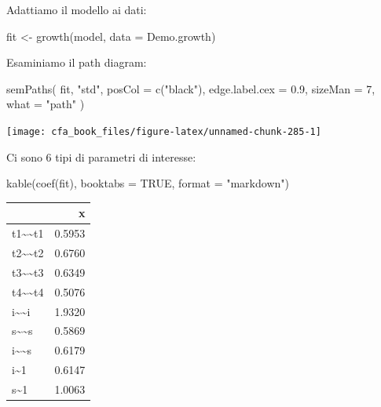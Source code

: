 \documentclass[
  11pt,
]{krantz}
\makeatletter
\newenvironment{Shaded}{\begin{snugshade}}{\end{snugshade}}
\newcommand{\AttributeTok}[1]{\textcolor[rgb]{0.61,0.61,0.61}{#1}}
\newcommand{\ConstantTok}[1]{\textcolor[rgb]{0,0,0}{#1}}
\newcommand{\DecValTok}[1]{\textcolor[rgb]{0.06,0.06,0.06}{#1}}
\newcommand{\FloatTok}[1]{\textcolor[rgb]{0.06,0.06,0.06}{#1}}
\newcommand{\FunctionTok}[1]{\textcolor[rgb]{0,0,0}{#1}}
\newcommand{\NormalTok}[1]{#1}
\newcommand{\OtherTok}[1]{\textcolor[rgb]{0.37,0.37,0.37}{#1}}
\newcommand{\StringTok}[1]{\textcolor[rgb]{0.5,0.5,0.5}{#1}}
\newenvironment{kframe}{%
\medskip{}
\setlength{\fboxsep}{.8em}
 \def\at@end@of@kframe{}%
 \ifinner\ifhmode%
  \def\at@end@of@kframe{\end{minipage}}%
  \begin{minipage}{\columnwidth}%
 \fi\fi%
 \def\FrameCommand##1{\hskip\@totalleftmargin \hskip-\fboxsep
 \colorbox{shadecolor}{##1}\hskip-\fboxsep
     \hskip-\linewidth \hskip-\@totalleftmargin \hskip\columnwidth}%
 \MakeFramed {\advance\hsize-\width
   \@totalleftmargin\z@ \linewidth\hsize
   \@setminipage}}%
 {\par\unskip\endMakeFramed%
 \at@end@of@kframe}
\renewenvironment{Shaded}{\begin{kframe}}{\end{kframe}}
\theoremstyle{definition}
\theoremstyle{definition}
\theoremstyle{definition}
\theoremstyle{definition}
\theoremstyle{remark}
\makeatother
\begin{document}
Adattiamo il modello ai dati:

\begin{Shaded}
\begin{Highlighting}[]
\NormalTok{fit }\OtherTok{\textless{}{-}} \FunctionTok{growth}\NormalTok{(model, }\AttributeTok{data =}\NormalTok{ Demo.growth)}
\end{Highlighting}
\end{Shaded}

Esaminiamo il path diagram:

\begin{Shaded}
\begin{Highlighting}[]
\FunctionTok{semPaths}\NormalTok{(}
\NormalTok{  fit, }\StringTok{"std"}\NormalTok{,}
  \AttributeTok{posCol =} \FunctionTok{c}\NormalTok{(}\StringTok{"black"}\NormalTok{),}
  \AttributeTok{edge.label.cex =} \FloatTok{0.9}\NormalTok{,}
  \AttributeTok{sizeMan =} \DecValTok{7}\NormalTok{,}
  \AttributeTok{what =} \StringTok{"path"}
\NormalTok{)}
\end{Highlighting}
\end{Shaded}

\begin{center}\texttt{[image: cfa\_book\_files/figure-latex/unnamed-chunk-285-1]} \end{center}

Ci sono 6 tipi di parametri di interesse:

\begin{Shaded}
\begin{Highlighting}[]
\FunctionTok{kable}\NormalTok{(}\FunctionTok{coef}\NormalTok{(fit), }\AttributeTok{booktabs =} \ConstantTok{TRUE}\NormalTok{, }\AttributeTok{format =} \StringTok{"markdown"}\NormalTok{)}
\end{Highlighting}
\end{Shaded}

\begin{longtable}[]{@{}lr@{}}
\toprule
& x \\
\midrule
\endhead
t1\textasciitilde\textasciitilde t1 & 0.5953 \\
t2\textasciitilde\textasciitilde t2 & 0.6760 \\
t3\textasciitilde\textasciitilde t3 & 0.6349 \\
t4\textasciitilde\textasciitilde t4 & 0.5076 \\
i\textasciitilde\textasciitilde i & 1.9320 \\
s\textasciitilde\textasciitilde s & 0.5869 \\
i\textasciitilde\textasciitilde s & 0.6179 \\
i\textasciitilde1 & 0.6147 \\
s\textasciitilde1 & 1.0063 \\
\bottomrule
\end{longtable}
\end{document}
